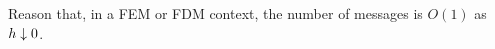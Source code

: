 Reason that, in a \ac{FEM} or \ac{FDM} context,
the number of messages is $O(1)$ as~$h\downarrow\nobreak 0$.

